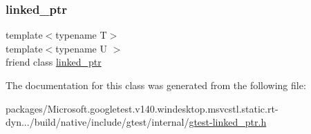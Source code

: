 \subsubsection{\texorpdfstring{linked\_ptr}{linked\_ptr}}
{\footnotesize\ttfamily template$<$typename T$>$ \\
template$<$typename U $>$ \\
friend class \mbox{\hyperlink{classtesting_1_1internal_1_1linked__ptr}{linked\+\_\+ptr}}\hspace{0.3cm}{\ttfamily [friend]}}



The documentation for this class was generated from the following file\+:\begin{DoxyCompactItemize}
\item 
packages/\+Microsoft.\+googletest.\+v140.\+windesktop.\+msvcstl.\+static.\+rt-\/dyn.../build/native/include/gtest/internal/\mbox{\hyperlink{gtest-linked__ptr_8h}{gtest-\/linked\+\_\+ptr.\+h}}\end{DoxyCompactItemize}
